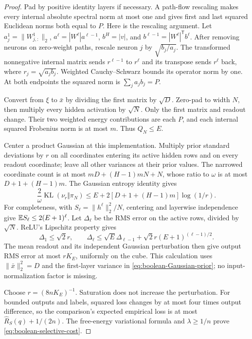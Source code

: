 \begin{proof}
Pad by positive identity layers if necessary. A path-flow rescaling makes every internal absolute spectral norm at most one and gives first and last squared Euclidean norms both equal to $P$. Here is the rescaling argument. Let $a^1_j=\|W^1_{j,:}\|_2$, $a^\ell=|W^\ell|a^{\ell-1}$, $b^H=|v|$, and $b^{\ell-1}=|W^\ell|^{\mathsf T}b^\ell$. After removing neurons on zero-weight paths, rescale neuron $j$ by $\sqrt{b_j/a_j}$. The transformed nonnegative internal matrix sends $r^{\ell-1}$ to $r^\ell$ and its transpose sends $r^\ell$ back, where $r_j=\sqrt{a_jb_j}$. Weighted Cauchy--Schwarz bounds its operator norm by one. At both endpoints the squared norm is $\sum_j a_jb_j=P$.

Convert from $\xi$ to $\bar x$ by dividing the first matrix by $\sqrt D$. Zero-pad to width $N$, then multiply every hidden activation by $\sqrt N$. Only the first matrix and readout change. Their two weighted energy contributions are each $P$, and each internal squared Frobenius norm is at most $m$. Thus $Q_N\le E$.

Center a product Gaussian at this implementation. Multiply prior standard deviations by $r$ on all coordinates entering its active hidden rows and on every readout coordinate; leave all other variances at their prior values. The narrowed coordinate count is at most $mD+(H-1)mN+N$, whose ratio to $\omega$ is at most $D+1+(H-1)m$. The Gaussian entropy identity gives
\[
 \frac2\omega\operatorname{KL}(\nu_r\Vert\pi_N)
 \le E+2[D+1+(H-1)m]\log(1/r).
\]
For completeness, with $S_\ell=\|h^\ell\|_2^2/N$, centering and layerwise independence give $\mathbb E S_\ell\le2(E+1)^\ell$. Let $\Delta_\ell$ be the RMS error on the active rows, divided by $\sqrt N$. ReLU's Lipschitz property gives
\[
 \Delta_1\le\sqrt2r,\qquad
 \Delta_\ell\le\sqrt E\Delta_{\ell-1}
        +\sqrt2r(E+1)^{(\ell-1)/2}.
\]
The mean readout and its independent Gaussian perturbation then give output RMS error at most $rK_E$, uniformly on the cube. This calculation uses $\|\bar x\|_2^2=D$ and the first-layer variance in \eqref{eq:boolean-Gaussian-prior}; no input-normalization factor is missing.

Choose $r=(8nK_E)^{-1}$. Saturation does not increase the perturbation. For bounded outputs and labels, squared loss changes by at most four times output difference, so the comparison's expected empirical loss is at most $\widehat R_S(q)+1/(2n)$. The free-energy variational formula and $\lambda\ge1/n$ prove \eqref{eq:boolean-selective-cost}.
\end{proof}


